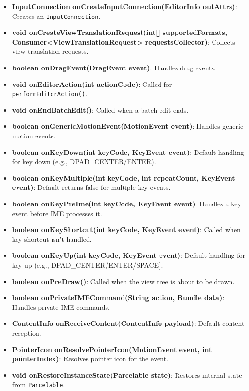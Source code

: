 \documentclass{report}
\begin{document}
\begin{itemize}
\begin{itemize}
                \item \textbf{InputConnection onCreateInputConnection(EditorInfo outAttrs)}: Creates an \texttt{InputConnection}.
                \item \textbf{void onCreateViewTranslationRequest(int[] supportedFormats, Consumer<ViewTranslationRequest> requestsCollector)}: Collects view translation requests.
                \item \textbf{boolean onDragEvent(DragEvent event)}: Handles drag events.
                \item \textbf{void onEditorAction(int actionCode)}: Called for \texttt{performEditorAction()}.
                \item \textbf{void onEndBatchEdit()}: Called when a batch edit ends.
                \item \textbf{boolean onGenericMotionEvent(MotionEvent event)}: Handles generic motion events.
                \item \textbf{boolean onKeyDown(int keyCode, KeyEvent event)}: Default handling for key down (e.g., DPAD\_CENTER/ENTER).
                \item \textbf{boolean onKeyMultiple(int keyCode, int repeatCount, KeyEvent event)}: Default returns false for multiple key events.
                \item \textbf{boolean onKeyPreIme(int keyCode, KeyEvent event)}: Handles a key event before IME processes it.
                \item \textbf{boolean onKeyShortcut(int keyCode, KeyEvent event)}: Called when key shortcut isn’t handled.
                \item \textbf{boolean onKeyUp(int keyCode, KeyEvent event)}: Default handling for key up (e.g., DPAD\_CENTER/ENTER/SPACE).
                \item \textbf{boolean onPreDraw()}: Called when the view tree is about to be drawn.
                \item \textbf{boolean onPrivateIMECommand(String action, Bundle data)}: Handles private IME commands.
                \item \textbf{ContentInfo onReceiveContent(ContentInfo payload)}: Default content reception.
                \item \textbf{PointerIcon onResolvePointerIcon(MotionEvent event, int pointerIndex)}: Resolves pointer icon for the event.
                \item \textbf{void onRestoreInstanceState(Parcelable state)}: Restores internal state from \texttt{Parcelable}.

\end{itemize}
\end{itemize}
\end{document}
